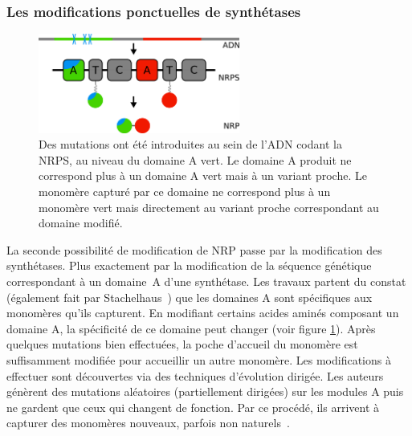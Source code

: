 \subsubsection{Les modifications ponctuelles de synthétases}

\begin{figure}[h!]
  \begin{center}
    \includegraphics[width=250px]{Figures/synthese/mutations.png}
    \caption{\label{mutation}Des mutations ont été introduites au sein de l'ADN codant la NRPS, au niveau du domaine A vert.
    Le domaine A produit ne correspond plus à un domaine A vert mais à un variant proche.
    Le monomère capturé par ce domaine ne correspond plus à un monomère vert mais directement au variant proche correspondant au domaine modifié.}
  \end{center}
\end{figure}

La seconde possibilité de modification de NRP passe par la modification des synthétases.
Plus exactement par la modification de la séquence génétique correspondant à un domaine~A d'une synthétase.
Les travaux \cite{villiers_mapping_2009, kries_reprogramming_2014, williams_engineering_2013} partent du constat (également fait par Stachelhaus~\cite{stachelhaus_specificity-conferring_1999}) que les domaines A sont spécifiques aux monomères qu'ils capturent.
En modifiant certains acides aminés composant un domaine A, la spécificité de ce domaine peut changer (voir figure \ref{mutation}).
Après quelques mutations bien effectuées, la poche d'accueil du monomère est suffisamment modifiée pour accueillir un autre monomère.
Les modifications à effectuer sont découvertes via des techniques d'évolution dirigée.
Les auteurs génèrent des mutations aléatoires (partiellement dirigées) sur les modules A puis ne gardent que ceux qui changent de fonction.
Par ce procédé, ils arrivent à capturer des monomères nouveaux, parfois non naturels~\cite{thirlway_introduction_2012}.



